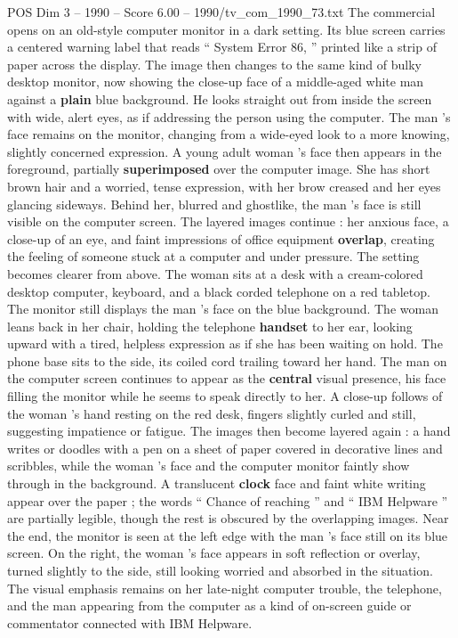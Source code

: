 \begin{textsample}{POS Dim 3 – 1990 – Score 6.00 – 1990/tv\_com\_1990\_73.txt}  \label{ex:f3_pos_055}
The commercial opens on an old-style computer monitor in a dark setting.
Its blue screen carries a centered warning label that reads “ System Error 86, ” printed like a strip of paper across the display.
The image then changes to the same kind of bulky desktop monitor, now showing the close-up face of a middle-aged white man against a \textbf{plain} blue background.
He looks straight out from inside the screen with wide, alert eyes, as if addressing the person using the computer.
The man ’s face remains on the monitor, changing from a wide-eyed look to a more knowing, slightly concerned expression.
A young adult woman ’s face then appears in the foreground, partially \textbf{superimposed} over the computer image.
She has short brown hair and a worried, tense expression, with her brow creased and her eyes glancing sideways.
Behind her, blurred and ghostlike, the man ’s face is still visible on the computer screen.
The layered images continue : her anxious face, a close-up of an eye, and faint impressions of office equipment \textbf{overlap}, creating the feeling of someone stuck at a computer and under pressure.
The setting becomes clearer from above.
The woman sits at a desk with a cream-colored desktop computer, keyboard, and a black corded telephone on a red tabletop.
The monitor still displays the man ’s face on the blue background.
The woman leans back in her chair, holding the telephone \textbf{handset} to her ear, looking upward with a tired, helpless expression as if she has been waiting on hold.
The phone base sits to the side, its coiled cord trailing toward her hand.
The man on the computer screen continues to appear as the \textbf{central} visual presence, his face filling the monitor while he seems to speak directly to her.
A close-up follows of the woman ’s hand resting on the red desk, fingers slightly curled and still, suggesting impatience or fatigue.
The images then become layered again : a hand writes or doodles with a pen on a sheet of paper covered in decorative lines and scribbles, while the woman ’s face and the computer monitor faintly show through in the background.
A translucent \textbf{clock} face and faint white writing appear over the paper ; the words “ Chance of reaching ” and “ IBM Helpware ” are partially legible, though the rest is obscured by the overlapping images.
Near the end, the monitor is seen at the left edge with the man ’s face still on its blue screen.
On the right, the woman ’s face appears in soft reflection or overlay, turned slightly to the side, still looking worried and absorbed in the situation.
The visual emphasis remains on her late-night computer trouble, the telephone, and the man appearing from the computer as a kind of on-screen guide or commentator connected with IBM Helpware.

\end{textsample}

